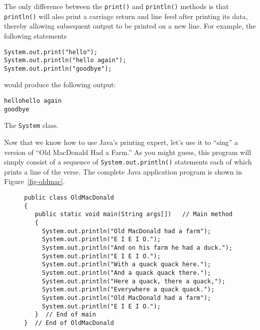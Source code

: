 The only difference between the {\tt print()} and {\tt println()}
methods is that {\tt println()} will also print a carriage return and
line feed after printing its data, thereby allowing subsequent output
to be printed on a new line.  For example, the following statements

\begin{jjjlisting}
\begin{lstlisting}
System.out.print("hello");         
System.out.println("hello again"); 
System.out.println("goodbye"); 
\end{lstlisting}
\end{jjjlisting}

\noindent would produce the following output:

\begin{jjjlisting}
\begin{lstlisting}
hellohello again
goodbye
\end{lstlisting}
\end{jjjlisting}

%
{The {\tt System} class.
\label{fig-systemUML}
\label{pg-fig-systemUML}}

\noindent Now that we know how to use Java's printing expert,
let's use it to ``sing'' a version of ``Old MacDonald Had a
Farm.'' As you might guess, this program will simply consist of a
sequence of {\tt System.out.println()} statements each of which prints a
line of the verse.  The complete Java application program is shown in
Figure~\ref{fig-oldmac}.

\begin{figure}[h]
\jjjprogstart
\begin{jjjlisting}
\begin{lstlisting}
public class OldMacDonald
{
   public static void main(String args[])   // Main method
   {
     System.out.println("Old MacDonald had a farm");
     System.out.println("E I E I O.");
     System.out.println("And on his farm he had a duck.");
     System.out.println("E I E I O.");
     System.out.println("With a quack quack here.");
     System.out.println("And a quack quack there.");
     System.out.println("Here a quack, there a quack,");
     System.out.println("Everywhere a quack quack.");
     System.out.println("Old MacDonald had a farm");
     System.out.println("E I E I O.");
   }  // End of main
}  // End of OldMacDonald
\end{lstlisting}
\end{jjjlisting}
\end{figure}

